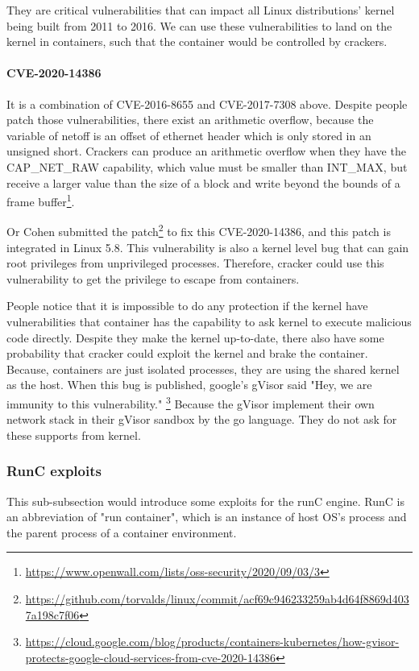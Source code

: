 They are critical vulnerabilities that can impact all Linux distributions' kernel being
built from 2011 to 2016. We can use these vulnerabilities to land on the kernel in
containers, such that the container would be controlled by crackers.

\paragraph{CVE-2020-14386} It is a combination of CVE-2016-8655 and CVE-2017-7308 above.
Despite people patch those vulnerabilities, there exist an arithmetic overflow, because
the variable of netoff is an offset of ethernet header which is only stored in an unsigned
short. Crackers can produce an arithmetic overflow when they have the CAP\_NET\_RAW capability,
which value must be smaller than INT\_MAX, but receive a larger value than the size of a
block and write beyond the bounds of a frame buffer\footnote{\url{https://www.openwall.com/lists/oss-security/2020/09/03/3}}.

Or Cohen submitted the patch\footnote{\url{https://github.com/torvalds/linux/commit/acf69c946233259ab4d64f8869d4037a198c7f06}}
to fix this CVE-2020-14386, and this patch is integrated in Linux 5.8. This vulnerability
is also a kernel level bug that can gain root privileges from unprivileged processes.
Therefore, cracker could use this vulnerability to get the privilege to escape from containers.

People notice that it is impossible to do any protection if the kernel have vulnerabilities
that container has the capability to ask kernel to execute malicious code directly. Despite
they make the kernel up-to-date, there also have some probability that cracker could exploit
the kernel and brake the container. Because, containers are just isolated processes, they
are using the shared kernel as the host. When this bug is published, google's gVisor said
"Hey, we are immunity to this vulnerability." \footnote{\url{https://cloud.google.com/blog/products/containers-kubernetes/how-gvisor-protects-google-cloud-services-from-cve-2020-14386}}
Because the gVisor implement their own network stack in their gVisor sandbox by the go language.
They do not ask for these supports from kernel.

\subsubsection{RunC exploits}

This sub-subsection would introduce some exploits for the runC engine.
RunC is an abbreviation of "run container", which is an instance of host OS's process and the
parent process of a container environment.

